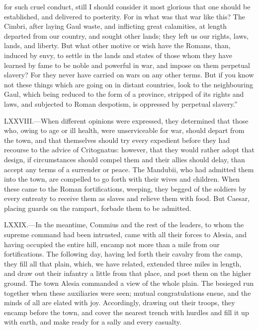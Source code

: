 for such cruel conduct, still I should consider it most glorious that
one should be established, and delivered to posterity. For in what was
that war like this? The Cimbri, after laying Gaul waste, and inflicting
great calamities, at length departed from our country, and sought other
lands; they left us our rights, laws, lands, and liberty. But what other
motive or wish have the Romans, than, induced by envy, to settle in the
lands and states of those whom they have learned by fame to be noble and
powerful in war, and impose on them perpetual slavery? For they never
have carried on wars on any other terms. But if you know not these
things which are going on in distant countries, look to the neighbouring
Gaul, which being reduced to the form of a province, stripped of its
rights and laws, and subjected to Roman despotism, is oppressed by
perpetual slavery.''

LXXVIII.—When different opinions were expressed, they determined that
those who, owing to age or ill health, were unserviceable for war,
should depart from the town, and that themselves should try every
expedient before they had recourse to the advice of Critognatus:
however, that they would rather adopt that design, if circumstances
should compel them and their allies should delay, than accept any terms
of a surrender or peace. The Mandubii, who had admitted them into the
town, are compelled to go forth with their wives and children. When
these came to the Roman fortifications, weeping, they begged of the
soldiers by every entreaty to receive them as slaves and relieve them
with food. But Caesar, placing guards on the rampart, forbade them to be
admitted.

LXXIX.—In the meantime, Commius and the rest of the leaders, to whom
the supreme command had been intrusted, came with all their forces to
Alesia, and having occupied the entire hill, encamp not more than a mile
from our fortifications. The following day, having led forth their
cavalry from the camp, they fill all that plain, which, we have related,
extended three miles in length, and draw out their infantry a little
from that place, and post them on the higher ground. The town Alesia
commanded a view of the whole plain. The besieged run together when
these auxiliaries were seen; mutual congratulations ensue, and the minds
of all are elated with joy. Accordingly, drawing out their troops, they
encamp before the town, and cover the nearest trench with hurdles and
fill it up with earth, and make ready for a sally and every casualty.


